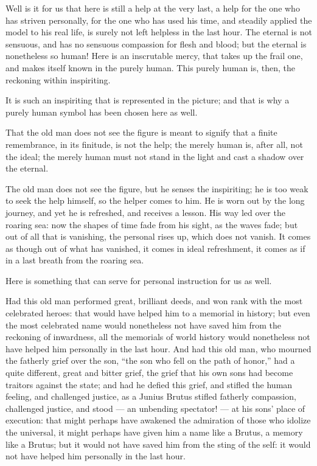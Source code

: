 \documentclass[12pt,a4paper]{book}
\begin{document}
Well is it for us that here is still a help at the very last, a help for the one who has striven personally, for the one who has used his time, and steadily applied the model to his real life, is surely not left helpless in the last hour. The eternal is not sensuous, and has no sensuous compassion for flesh and blood; but the eternal is nonetheless so human! Here is an inscrutable mercy, that takes up the frail one,
and makes itself known in the purely human. This purely human is, then, the reckoning within inspiriting.

It is such an inspiriting that is represented in the picture; and that is why a purely human symbol has been chosen here as well.

That the old man does not see the figure is meant to signify that a finite remembrance, in its finitude, is not the help; the merely human is, after all, not the ideal; the merely human must not stand in the light and cast a shadow over the eternal.

The old man does not see the figure, but he senses the inspiriting; he is too weak to seek the help himself, so the helper comes to him. He is worn out by the long journey, and yet he is refreshed, and receives a lesson. His way led over the roaring sea: now the shapes of time fade from his sight, as the waves fade; but out of all that is vanishing, the personal rises up, which does not vanish. It comes as though out of what has vanished, it comes in ideal refreshment, it comes as if in a last breath from the roaring sea.

Here is something that can serve for personal instruction for us as well.

Had this old man performed great, brilliant deeds, and won rank with the most celebrated heroes: that would have helped him to a memorial in history; but even the most celebrated name would nonetheless not have saved him from the reckoning of inwardness, all the memorials of world history would nonetheless not have helped him personally in the last hour.
And had this old man, who mourned the fatherly grief over the son, ``the son who fell on the path of honor,'' had a quite different, great and bitter grief, the grief that his own sons had become traitors against the state; and had he defied this grief, and stifled the human feeling, and challenged justice, as a Junius Brutus stifled fatherly compassion, challenged justice, and stood --- an unbending spectator! --- at his sons' place of execution: that might perhaps have awakened the admiration of those who idolize the universal, it might perhaps have given him a name like a Brutus,
a memory like a Brutus; but it would not have saved him from the sting of the self: it would not have helped him personally in the last hour.
\end{document}
